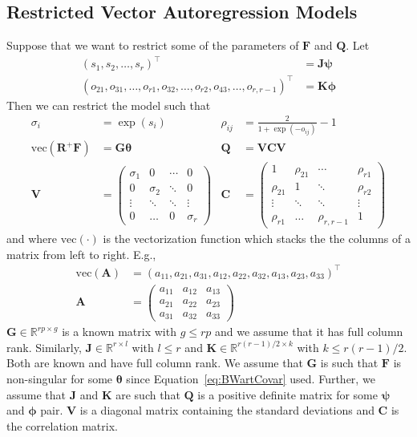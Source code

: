 \documentclass[notitlepage]{article}
\renewcommand{\vec}[1]{\bm{#1}}
\newcommand{\mat}[1]{\mathbf{#1}}
\newcommand{\Lparen}[1]{\left( #1\right)}
\newcommand{\optor}[2]{#1\Lparen{#2}}
\newcommand{\vecOP}[1]{\optor{\text{vec}}{#1}}
\newcommand{\dimState}{p}
\newcommand{\dimRng}{r}
\begin{document}
\subsection{Restricted Vector Autoregression Models}
Suppose that we want to restrict some of the parameters of $\mat{F}$ and $\mat{Q}$. Let%
%
\begin{align*}
  (s_1,s_2,\dots, s_\dimRng)^\top&=\mat{J}\vec\psi \\
  (o_{21},o_{31},\dots,o_{\dimRng1},o_{32},\dots,o_{r2},o_{43},\dots,o_{\dimRng,\dimRng-1})^\top&=\mat{K}\vec\phi  
\end{align*} %
%
Then we can restrict the model such that %
%
\begin{align*}
\sigma_i &= \exp(s_i) & 
  \rho_{ij}&= \frac{2}{1 + \exp(-o_{ij})} - 1 \\
\vecOP{\mat{R}^+\mat{F}} &= \mat{G}\vec{\theta} &  
  \mat{Q} &= \mat{V}\mat{C}\mat{V} \\
\mat{V} &= \begin{pmatrix} 
     \sigma_1 & 0 & \cdots & 0 \\
     0 & \sigma_2 & \ddots & 0 \\
     \vdots & \ddots & \ddots & \vdots \\
     0 & \dots & 0 & \sigma_\dimRng
   \end{pmatrix} &
  \mat{C} &= \begin{pmatrix} 
     1 & \rho_{21} & \cdots & \rho_{\dimRng1} \\
     \rho_{21} & 1 & \ddots & \rho_{\dimRng2} \\
     \vdots & \ddots & \ddots & \vdots \\
     \rho_{\dimRng1} & \dots & \rho_{\dimRng,\dimRng-1} & 1
   \end{pmatrix}
\end{align*}%
%
and where $\vecOP{\cdot}$ is the vectorization function which stacks the the columns of a matrix from left to right. E.g., %
%
\begin{align*}
\vecOP{\mat{A}} &= \Lparen{
	a_{11}, a_{21}, a_{31}, 
	a_{12}, a_{22}, a_{32},
	a_{13}, a_{23}, a_{33}}^\top \\
\mat{A} &= \begin{pmatrix}
	a_{11} & a_{12} & a_{13} \\
	a_{21} & a_{22} & a_{23} \\
	a_{31} & a_{32} & a_{33}
\end{pmatrix}
\end{align*}
%
$\mat{G}\in\mathbb{R}^{\dimRng\dimState \times g}$ is a known matrix with $g \leq \dimRng\dimState$ and we assume that it has full column rank. Similarly, $\mat{J}\in\mathbb{R}^{\dimRng \times l}$ with $l \leq \dimRng$ and $\mat{K}\in\mathbb{R}^{\dimRng(\dimRng - 1)/2 \times k}$ with $k\leq \dimRng(\dimRng - 1)/2$. Both are known and have full column rank. 
We assume that $\mat{G}$ is such that $\mat{F}$ is non-singular for some $\vec{\theta}$ since 
Equation~\eqref{eq:BWartCovar} used. Further, we assume that $\mat{J}$ and $\mat{K}$ are such that $\mat{Q}$ is a positive definite matrix for some $\vec{\psi}$ and $\vec{\phi}$ pair. $\mat{V}$ is a diagonal matrix containing the standard deviations and $\mat{C}$ is the correlation matrix.
\end{document}
